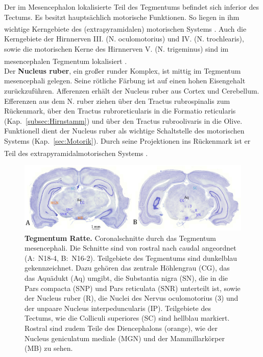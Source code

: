 Der im Mesencephalon lokalisierte Teil des Tegmentums befindet sich inferior des Tectums. Es besitzt hauptsächlich motorische Funktionen. So liegen in ihm wichtige Kerngebiete des (extrapyramidalen) motorischen Systems \textsuperscript{\cite[Kap.~14]{penzlin2005tierphys}}.
Auch die Kerngebiete der Hirnnerven III. (N. oculomotorius) und IV. (N. trochlearis), sowie die motorischen Kerne des Hirnnerven V. (N. trigeminus) sind im mesencephalen Tegmentum lokalisiert \textsuperscript{\cite[Kap.~6]{trepel2011neuroanatomie}}.\\

\noindent Der \textbf{Nucleus ruber}, ein großer runder Komplex, ist mittig im Tegmentum mesencephali gelegen. Seine rötliche Färbung ist auf einen hohen Eisengehalt zurückzuführen. Afferenzen erhält der Nucleus ruber aus Cortex und Cerebellum. Efferenzen aus dem N. ruber ziehen über den Tractus rubrospinalis zum Rückenmark, über den Tractus rubroreticularis in die Formatio reticularis (Kap.~\ref{subsec:Hirnstamm}) und über den Tractus rubroolivaris in die Olive. Funktionell dient der Nucleus ruber als wichtige Schaltstelle des motorischen Systems (Kap.~\ref{sec:Motorik}). Durch seine Projektionen ins Rückenmark ist er Teil des extrapyramidalmotorischen Systems \textsuperscript{\cite[Kap.~6]{trepel2011neuroanatomie}}.\\

\begin{figure}[H]
    \centering
    \includegraphics[width=\textwidth]{pictures/Bilder_Jule/Ratte/tegmentum_mesenc.png}
    \caption[Tegmentum Ratte]{\textbf{Tegmentum Ratte.} Coronalschnitte durch das Tegmentum mesencephali. Die Schnitte sind von rostral nach caudal angeordnet (A:~N18-4, B:~N16-2). Teilgebiete des Tegmentums sind dunkelblau gekennzeichnet. Dazu gehören das zentrale Höhlengrau (CG), das das Aquädukt (Aq) umgibt, die Substantia nigra (SN), die in die Pars compacta (SNP) und Pars reticulata (SNR) unterteilt ist, sowie der Nucleus ruber (R), die Nuclei des Nervus oculomotorius (3) und der unpaare Nucleus interpeduncularis (IP). Teilgebiete des Tectums, wie die Colliculi superiores (SC) sind hellblau markiert. Rostral sind zudem Teile des Diencephalons (orange), wie der Nucleus geniculatum mediale (MGN) und der Mammillarkörper (MB) zu sehen.}
    \label{fig:tegmentum_mesenc}
\end{figure}{}


